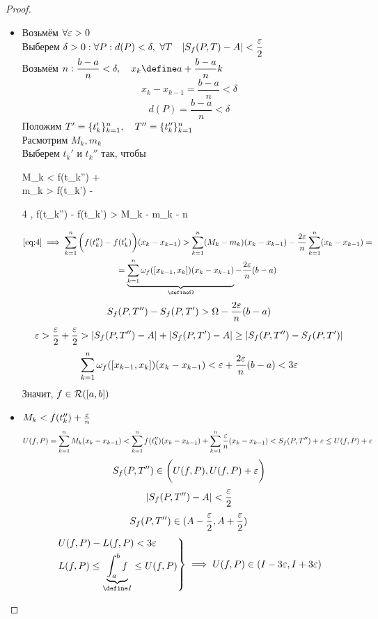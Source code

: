 \begin{proof}
	\hfill
	\begin{itemize}
		\item Возьмём $ \forall \veps > 0 $ \\
		Выберем $ \delta > 0 : \forall P : d(P) < \delta, ~ \forall T \quad | S_f(P, T) - A | < \dfrac\veps2 $ \\
		Возьмём $ n : \dfrac{b - a}n < \delta, \quad x_k \define a + \dfrac{b - a}nk $
		$$ x_k - x_{k - 1} = \frac{b - a}n < \delta $$
		$$ d(P) = \frac{b - a}n < \delta $$
		Положим $ T' = \seq[n]{t_k'}k, \quad T'' = \seq[n]{t_k''}k $ \\
		Расмотрим $ M_k, m_k $ \\
		Выберем $ t_k' $ и $ t_k'' $ так, чтобы
		\begin{mequ}
			 M_k < f(t_k'') + \frac{} \\
			 m_k > f(t_k') - \frac{}
		\end{mequ}
		\begin{equ}4
			,  \implies f(t_k'') - f(t_k') > M_k - m_k - \frac{2\veps}n
		\end{equ}
		\begin{multline*}
			\eref4 \implies \sum_{k = 1}^n \bigg( f(t_k'') - f(t_k') \bigg)(x_k - x_{k - 1}) > \sum_{k = 1}^n ( M_k - m_k)(x_k - x_{k - 1}) - \frac{2\veps}n \sum_{k = 1}^n (x_k - x_{k - 1}) = \\ = \underbrace{\sum_{k = 1}^n \omega_f([x_{k - 1}, x_k])(x_k - x_{k - 1})}_{\define \Omega} - \frac{2\veps}n(b - a)
		\end{multline*}
		$$ S_f(P, T'') - S_f(P, T') > \Omega - \frac{2\veps}n(b - a) $$
		$$ \veps > \frac\veps2 + \frac\veps2 > |S_f(P, T'') - A | + | S_f(P, T') - A | \ge | S_f(P, T'') - S_f(P, T') | $$
		$$ \sum_{k = 1}^n \omega_f([x_{k - 1}, x_k])(x_k - x_{k - 1}) < \veps + \frac{2\veps}n(b - a) < 3\veps $$
		Значит, $ f \in \Ri([a, b]) $
		\item $ M_k < f(t_k'') + \frac\veps{n} $
		$$ U(f, P) = \sum_{k = 1}^n M_k(x_k - x_{k - 1}) < \sum_{k = 1}^n f(t_k'')(x_k - x_{k - 1}) + \sum_{k = 1}^n \frac\veps{n}(x_k - x_{k - 1}) < S_f(P, T'') + \veps \le U(f, P) + \veps $$
		$$ S_f(P, T'') \in \bigg( U(f, P), U(f, P) + \veps \bigg) $$
		$$ | S_f(P, T'') - A | < \frac\veps2 $$
		$$ S_f(P, T'') \in (A - \frac\veps2, A + \frac\veps2) $$
		$$
		\begin{rcases}
			U(f, P) - L(f, P) < 3\veps \\
			L(f, P) \le \underbrace{\int_a^b f}_{\define I} \le U(f, P)
		\end{rcases} \implies U(f, P) \in (I - 3\veps, I + 3\veps) $$
	\end{itemize}
\end{proof}

